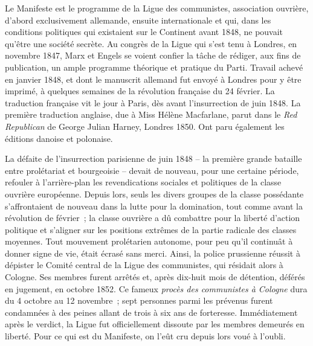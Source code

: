 \documentclass[french,twoside]{book} %
\begin{document}
\noindent Le Manifeste est le programme de la Ligue des communistes, association ouvrière, d’abord exclusivement allemande, ensuite internationale et qui, dans les conditions politiques qui existaient sur le Continent avant 1848, ne pouvait qu’être une société secrète. Au congrès de la Ligue qui s’est tenu à Londres, en novembre 1847, Marx et Engels se voient confier la tâche de rédiger, aux fins de publication, un ample programme théorique et pratique du Parti. Travail achevé en janvier 1848, et dont le manuscrit allemand fut envoyé à Londres pour y être imprimé, à quelques semaines de la révolution française du 24 février. La traduction française vit le jour à Paris, dès avant l’insurrection de juin 1848. La première traduction anglaise, due à Miss Hélène Macfarlane, parut dans le \emph{Red Republican} de George Julian Harney, Londres 1850. Ont paru également les éditions danoise et polonaise.\par
La défaite de l’insurrection parisienne de juin 1848 – la première grande bataille entre prolétariat et bourgeoisie – devait de nouveau, pour une certaine période, refouler à l’arrière-plan les revendications sociales et politiques de la classe ouvrière européenne. Depuis lors, seuls les divers groupes de la classe possédante s’affrontaient de nouveau dans la lutte pour la domination, tout comme avant la révolution de février ; la classe ouvrière a dû combattre pour la liberté d’action politique et s’aligner sur les positions extrêmes de la partie radicale des classes moyennes. Tout mouvement prolétarien autonome, pour peu qu’il continuât à donner signe de vie, était écrasé sans merci. Ainsi, la police prussienne réussit à dépister le Comité central de la Ligue des communistes, qui résidait alors à Cologne. Ses membres furent arrêtés et, après dix-huit mois de détention, déférés en jugement, en octobre 1852. Ce fameux \emph{procès des communistes à Cologne} dura du 4 octobre au 12 novembre ; sept personnes parmi les prévenus furent condamnées à des peines allant de trois à six ans de forteresse. Immédiatement après le verdict, la Ligue fut officiellement dissoute par les membres demeurés en liberté. Pour ce qui est du Manifeste, on l’eût cru depuis lors voué à l’oubli.\par
\end{document}
